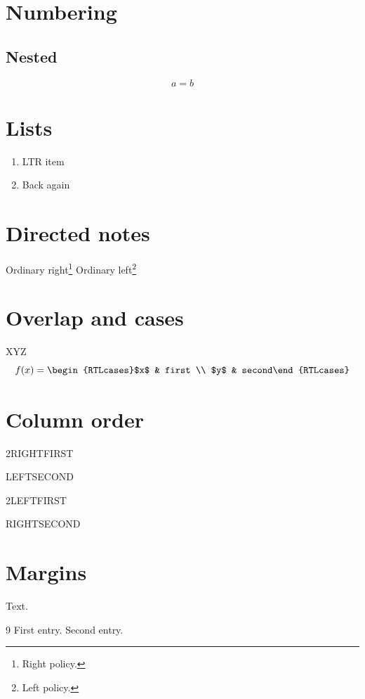 \documentclass{article}
\begin{document}
\ifdefined\directlua
  \TeXXeTOff\TeXXeTOn
\else
  \TeXXeTOff\ifnum{}\else{}\fi
  \TeXXeTOn\ifnum{}\else{}\fi
\fi
\section{Numbering}\subsection{Nested}
\begin{equation}a=b\end{equation}
\newpage
\section*{Lists}
\begin{enumerate}\item LTR item
\item Back again\end{enumerate}
\newpage
\section*{Directed notes}
\setfootnoteRL Ordinary right\footnote{Right policy.}
\setfootnoteLR Ordinary left\footnote{Left policy.}
\footnotemark{}
\footnotemark{}
\newpage
\section*{Overlap and cases}
XYZ
\[f(x)=\begin{RTLcases}$x$ & first \\ $y$ & second\end{RTLcases}\]
\newpage
\section*{Column order}
\RTLmulticolcolumns\begin{multicols}{2}RIGHTFIRST\par\columnbreak LEFTSECOND\end{multicols}
\LTRmulticolcolumns\begin{multicols}{2}LEFTFIRST\par\columnbreak RIGHTSECOND\end{multicols}
\newpage
\section*{Margins}
Text.
\newpage
\setRTLbibitems
\begin{thebibliography}{9} First entry. Second entry.\end{thebibliography}
\setdefaultbibitems
\end{document}
